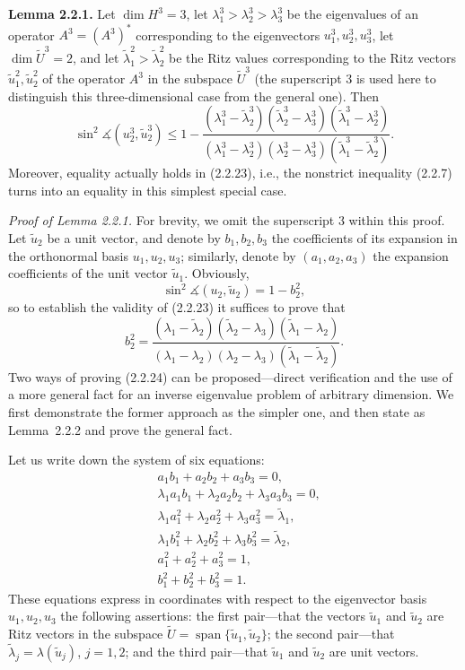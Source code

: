 \documentclass[11pt,oneside]{book}
\newcommand{\myspan}{\operatorname{span}}
\newcommand{\ang}{\measuredangle}
\begin{document}
\textbf{Lemma 2.2.1.} Let $\dim H^3 = 3$, let $\lambda_1^3 > \lambda_2^3 > \lambda_3^3$ be the eigenvalues of an operator $A^3 = (A^3)^*$ corresponding to the eigenvectors $u_1^3, u_2^3, u_3^3$, let $\dim \widetilde{U}^3 = 2$, and let $\tilde{\lambda}_1^2 > \tilde{\lambda}_2^2$ be the Ritz values corresponding to the Ritz vectors $\tilde{u}_1^2, \tilde{u}_2^2$ of the operator $A^3$ in the subspace $\widetilde{U}^3$ (the superscript $3$ is used here to distinguish this three-dimensional case from the general one). %
Then
\[
\sin^2 \ang(u_2^3, \tilde{u}_2^3) \leqslant 1 - \frac{(\lambda_1^3 - \tilde{\lambda}_2^3)(\tilde{\lambda}_2^3 - \lambda_3^3)(\tilde{\lambda}_1^3 - \lambda_2^3)}{(\lambda_1^3 - \lambda_2^3)(\lambda_2^3 - \lambda_3^3)(\tilde{\lambda}_1^3 - \tilde{\lambda}_2^3)} . \tag{2.2.23}
\]
Moreover, equality actually holds in (2.2.23), i.e., the nonstrict inequality (2.2.7) turns into an equality in this simplest special case.

\textit{Proof of Lemma 2.2.1.} For brevity, we omit the superscript $3$ within this proof. Let $\tilde{u}_2$ be a unit vector, and denote by $b_1, b_2, b_3$ the coefficients of its expansion in the orthonormal basis $u_1, u_2, u_3$; similarly, denote by $(a_1, a_2, a_3)$ the expansion coefficients of the unit vector $\tilde{u}_1$. Obviously,
\[
\sin^2 \ang(u_2, \tilde{u}_2) = 1 - b_2^2 ,
\]
so to establish the validity of (2.2.23) it suffices to prove that
\[
b_2^2 = \frac{(\lambda_1 - \tilde{\lambda}_2)(\tilde{\lambda}_2 - \lambda_3)(\tilde{\lambda}_1 - \lambda_2)}{(\lambda_1 - \lambda_2)(\lambda_2 - \lambda_3)(\tilde{\lambda}_1 - \tilde{\lambda}_2)} . \tag{2.2.24}
\]
Two ways of proving (2.2.24) can be proposed---direct verification and the use of a more general fact for an inverse eigenvalue problem of arbitrary dimension. We first demonstrate the former approach as the simpler one, and then state as Lemma~2.2.2 and prove the general fact.

Let us write down the system of six equations:
\[
\begin{aligned}
&a_1 b_1 + a_2 b_2 + a_3 b_3 = 0 , \\
&\lambda_1 a_1 b_1 + \lambda_2 a_2 b_2 + \lambda_3 a_3 b_3 = 0 , \\
&\lambda_1 a_1^2 + \lambda_2 a_2^2 + \lambda_3 a_3^2 = \tilde{\lambda}_1 , \\
&\lambda_1 b_1^2 + \lambda_2 b_2^2 + \lambda_3 b_3^2 = \tilde{\lambda}_2 , \\
&a_1^2 + a_2^2 + a_3^2 = 1 , \\
&b_1^2 + b_2^2 + b_3^2 = 1 .
\end{aligned}
\]
These equations express in coordinates with respect to the eigenvector basis $u_1, u_2, u_3$ the following assertions: the first pair---that the vectors $\tilde{u}_1$ and $\tilde{u}_2$ are Ritz vectors in the subspace $\widetilde{U} = \myspan\{\tilde{u}_1, \tilde{u}_2\}$; the second pair---that $\tilde{\lambda}_j = \lambda(\tilde{u}_j)$, $j = 1, 2$; and the third pair---that $\tilde{u}_1$ and $\tilde{u}_2$ are unit vectors.
\end{document}
